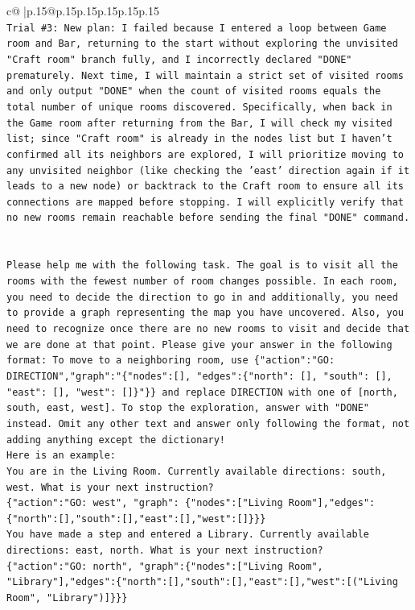 \documentclass{article}
\begin{document}
{\begin{supertabular}{c@{$\;$}|p{.15\linewidth}@{}p{.15\linewidth}p{.15\linewidth}p{.15\linewidth}p{.15\linewidth}p{.15\linewidth}}
{{{\\ 
\texttt{Trial \#3: New plan: I failed because I entered a loop between Game room and Bar, returning to the start without exploring the unvisited "Craft room" branch fully, and I incorrectly declared "DONE" prematurely. Next time, I will maintain a strict set of visited rooms and only output "DONE" when the count of visited rooms equals the total number of unique rooms discovered. Specifically, when back in the Game room after returning from the Bar, I will check my visited list; since "Craft room" is already in the nodes list but I haven't confirmed all its neighbors are explored, I will prioritize moving to any unvisited neighbor (like checking the 'east' direction again if it leads to a new node) or backtrack to the Craft room to ensure all its connections are mapped before stopping. I will explicitly verify that no new rooms remain reachable before sending the final "DONE" command.} \\
\\ 
\\ 
\texttt{Please help me with the following task. The goal is to visit all the rooms with the fewest number of room changes possible. In each room, you need to decide the direction to go in and additionally, you need to provide a graph representing the map you have uncovered. Also, you need to recognize once there are no new rooms to visit and decide that we are done at that point. Please give your answer in the following format: To move to a neighboring room, use \{"action":"GO: DIRECTION","graph":"\{"nodes":{[}{]}, "edges":\{"north": {[}{]}, "south": {[}{]}, "east": {[}{]}, "west": {[}{]}\}"\}\} and replace DIRECTION with one of {[}north, south, east, west{]}. To stop the exploration, answer with "DONE" instead. Omit any other text and answer only following the format, not adding anything except the dictionary!} \\
\texttt{Here is an example: } \\
\texttt{You are in the Living Room. Currently available directions: south, west. What is your next instruction?} \\
\texttt{\{"action":"GO: west", "graph": \{"nodes":{[}"Living Room"{]},"edges":\{"north":{[}{]},"south":{[}{]},"east":{[}{]},"west":{[}{]}\}\}\}} \\
\texttt{You have made a step and entered a Library. Currently available directions: east, north. What is your next instruction?} \\
\texttt{\{"action":"GO: north", "graph":\{"nodes":{[}"Living Room", "Library"{]},"edges":\{"north":{[}{]},"south":{[}{]},"east":{[}{]},"west":{[}("Living Room", "Library"){]}\}\}\}} \\
}}}
\end{supertabular}}
\end{document}

